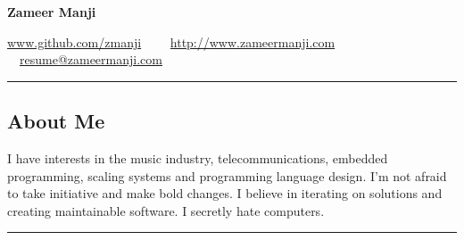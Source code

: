 \documentclass[10pt,letterpaper]{article}
\begin{document}
\begin{center}
{\huge \textbf{Zameer Manji}}


\href{http://www.github.com/zmanji/}{www.github.com/zmanji}\ \ \textbullet
\ \ \href{http://www.zameermanji.com}{http://www.zameermanji.com}\ \ \textbullet
\ \ \href{malto:resume@zameermanji.com}{resume@zameermanji.com}

\end{center}

\hrule
\vspace{-0.4em}
\subsection*{About Me}
I have interests in the music industry, telecommunications, embedded
programming, scaling systems and programming language design. I'm not afraid to
take initiative and make bold changes. I believe in iterating on solutions and
creating maintainable software. I secretly hate computers.
\\

\hrule
\vspace{-0.4em}
\end{document}
